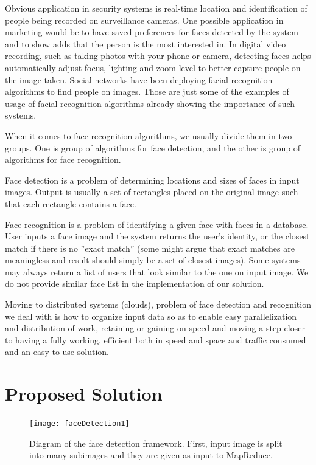 \documentclass[11pt, draftclsnofoot, onecolumn]{IEEEtran}
\begin{document}
Obvious application in security systems is real-time location and identification of people being recorded on surveillance cameras. One possible application in marketing would be to have saved preferences for faces detected by the system and to show adds that the person is the most interested in. In digital video recording, such as taking photos with your phone or camera, detecting faces helps automatically adjust focus, lighting and zoom level to better capture people on the image taken. Social networks have been deploying facial recognition algorithms to find people on images. Those are just some of the examples of usage of facial recognition algorithms already showing the importance of such systems.

When it comes to face recognition algorithms, we usually divide them in two groups. One is group of algorithms for face detection, and the other is group of algorithms for face recognition.

Face detection is a problem of determining locations and sizes of faces in input images. Output is usually a set of rectangles placed on the original image such that each rectangle contains a face.

Face recognition is a problem of identifying a given face with faces in a database. User inputs a face image and the system returns the user's identity, or the closest match if there is no ''exact match'' (some might argue that exact matches are meaningless and result should simply be a set of closest images). Some systems may always return a list of users that look similar to the one on input image. We do not provide similar face list in the implementation of our solution.

Moving to distributed systems (clouds), problem of face detection and recognition we deal with is how to organize input data so as to enable easy parallelization and distribution of work, retaining or gaining on speed and moving a step closer to having a fully working, efficient both in speed and space and traffic consumed and an easy to use solution.

\section{Proposed Solution} \label{sec:solution}

\begin{figure}
\centering
\texttt{[image: faceDetection1]}
\caption{Diagram of the face detection framework. First, input image is split into many subimages and they are given as input to MapReduce.}
\end{figure}
\end{document}
